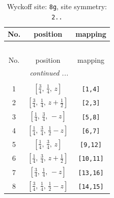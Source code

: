 \documentclass[fleqn,8pt]{jsarticle}
\begin{document}
\renewcommand{\arraystretch}{1.2}
\begin{longtable}{ccc}
\caption{Wyckoff site: {\tt 8g}, site symmetry: {\tt 2..}}
 \\
 \hline \hline
No. & position & mapping \\ \hline \endfirsthead

\multicolumn{2}{l}{\tablename\ \thetable{}} \\
 \hline \hline
No. & position & mapping \\ \hline \endhead

 \hline \hline
\multicolumn{2}{r}{\footnotesize\it continued ...} \\ \endfoot

 \hline \hline
\multicolumn{2}{r}{} \\ \endlastfoot

1 & $\left[ \frac{3}{4},\, \frac{1}{4},\, z \right]$ & {\tt [1,4]} \\ \hline
2 & $\left[ \frac{3}{4},\, \frac{1}{4},\, z + \frac{1}{2} \right]$ & {\tt [2,3]} \\ \hline
3 & $\left[ \frac{1}{4},\, \frac{3}{4},\, - z \right]$ & {\tt [5,8]} \\ \hline
4 & $\left[ \frac{1}{4},\, \frac{3}{4},\, \frac{1}{2} - z \right]$ & {\tt [6,7]} \\ \hline
5 & $\left[ \frac{1}{4},\, \frac{3}{4},\, z \right]$ & {\tt [9,12]} \\ \hline
6 & $\left[ \frac{1}{4},\, \frac{3}{4},\, z + \frac{1}{2} \right]$ & {\tt [10,11]} \\ \hline
7 & $\left[ \frac{3}{4},\, \frac{1}{4},\, - z \right]$ & {\tt [13,16]} \\ \hline
8 & $\left[ \frac{3}{4},\, \frac{1}{4},\, \frac{1}{2} - z \right]$ & {\tt [14,15]} \\
\end{longtable}
\renewcommand{\arraystretch}{1.2}
\end{document}
